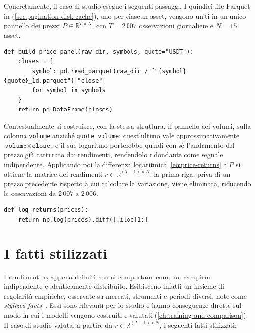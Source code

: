 Concretamente, il caso di studio esegue i seguenti passaggi. I quindici file Parquet in  (\cref{sec:pagination-disk-cache}), uno per ciascun asset, vengono uniti in un unico pannello dei prezzi $P\in\mathbb{R}^{T\times N}$, con $T=2\,007$ osservazioni giornaliere e $N=15$ asset.

\begin{listing}[H]
\begin{verbatim}
def build_price_panel(raw_dir, symbols, quote="USDT"):
    closes = {
        symbol: pd.read_parquet(raw_dir / f"{symbol}{quote}_1d.parquet")["close"]
        for symbol in symbols
    }
    return pd.DataFrame(closes)
\end{verbatim}
\caption{\texttt{build\_price\_panel}}
\label{lst:build-price-panel}
\end{listing}

Contestualmente si costruisce, con la stessa struttura, il pannello dei volumi, sulla colonna \texttt{volume} anziché \texttt{quote\_volume}: quest'ultimo vale approssimativamente $\texttt{volume} \times \texttt{close}$, e il suo logaritmo porterebbe quindi con sé l'andamento del prezzo già catturato dai rendimenti, rendendolo ridondante come segnale indipendente. Applicando poi la differenza logaritmica~\eqref{eq:price-returns} a $P$ si ottiene la matrice dei rendimenti $r\in\mathbb{R}^{(T-1)\times N}$: la prima riga, priva di un prezzo precedente rispetto a cui calcolare la variazione, viene eliminata, riducendo le osservazioni da $2\,007$ a $2\,006$.

\begin{listing}[H]
\begin{verbatim}
def log_returns(prices):
    return np.log(prices).diff().iloc[1:]
\end{verbatim}
\caption{\texttt{log\_returns}}
\label{lst:log-returns}
\end{listing}

\section{I fatti stilizzati}
\label{sec:stylized-facts}

I rendimenti $r_t$ appena definiti non si comportano come un campione indipendente e identicamente distribuito. Esibiscono infatti un insieme di regolarità empiriche, osservate su mercati, strumenti e periodi diversi, note come \emph{stylized facts}~\cite{cont2001empirical}. Essi sono rilevanti per lo studio e hanno conseguenze dirette sul modo in cui i modelli vengono costruiti e valutati (\cref{ch:training-and-comparison}). Il caso di studio valuta, a partire da $r\in\mathbb{R}^{(T-1)\times N}$, i seguenti fatti stilizzati:

